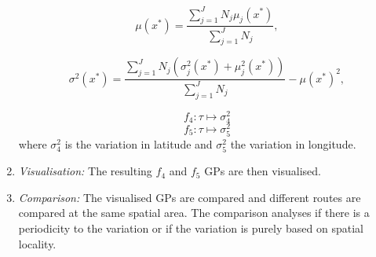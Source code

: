 \begin{enumerate}
    \begin{equation} \label{eq:mean-point-wise-combined}
        \mu(x^*) = \frac{\sum_{j=1}^{J} N_j\mu_j(x^*)}{\sum_{j=1}^{J} N_j},
    \end{equation}

    \begin{equation} \label{eq:var-point-wise-combined}
        \sigma^2(x^*) = \frac{\sum_{j=1}^{J} N_j(\sigma_j^2(x^*) + \mu_j^2(x^*))}{\sum_{j=1}^{J} N_j} - \mu(x^*)^2,
    \end{equation}

    \begin{equation} \label{eq:gps-var-f4}
        f_4: \tau \longmapsto \sigma_4^2
    \end{equation}
    \begin{equation} \label{eq:gps-var-f5}
        f_5: \tau \longmapsto \sigma_5^2
    \end{equation}
    where $\sigma_4^2$ is the variation in latitude and $\sigma_5^2$ the variation in longitude.

    \item \textit{Visualisation:}
    The resulting $f_4$ and $f_5$ GPs are then visualised. 

    \item \textit{Comparison:}
    The visualised GPs are compared and different routes are compared at the same spatial area.
    The comparison analyses if there is a periodicity to the variation or if the variation is purely based on spatial locality.
\end{enumerate} 